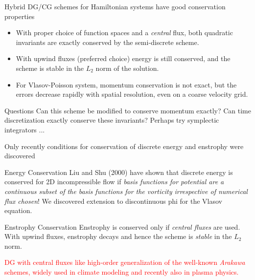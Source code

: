\documentclass[pdf]{beamer}
\newcommand{\mypause}{}
\theoremstyle{definition}
\begin{document}
\begin{frame}{Hybrid DG/CG schemes for Hamiltonian systems have good
    conservation properties}

  \begin{itemize}
  \item With proper choice of function spaces and a \emph{central}
    flux, both quadratic invariants are exactly conserved by the
    semi-discrete scheme.
  \item With upwind fluxes (preferred choice) energy is still
    conserved, and the scheme is stable in the $L_2$ norm of the
    solution.
  \item For Vlasov-Poisson system, momentum conservation is not exact,
    but the errors decrease rapidly with spatial resolution, even on a
    coarse velocity grid.
  \end{itemize}
  \mypause
  \begin{block}{Questions}
    Can this scheme be modified to conserve momentum exactly? Can time
    discretization exactly conserve these invariants?  Perhaps try
    symplectic integrators ...
  \end{block}

\end{frame}

\begin{frame}{Only recently conditions for conservation of discrete
    energy and enstrophy were discovered}%
  \small
  \begin{block}{Energy Conservation}
    Liu and Shu (2000) have shown that discrete energy is conserved
    for 2D incompressible flow if \emph{basis functions for potential
      are a continuous subset of the basis functions for the vorticity
      irrespective of numerical flux chosen}! We discovered extension
    to discontinuous phi for the Vlasov equation.
  \end{block}

  \begin{block}{Enstrophy Conservation}
    Enstrophy is conserved only if \emph{central fluxes} are
    used. With upwind fluxes, enstrophy decays and hence the scheme is
    \emph{stable} in the $L_2$ norm.
  \end{block}

  \mypause \textcolor{red}{DG with central fluxes like high-order
    generalization of the well-known \emph{Arakawa} schemes, widely
    used in climate modeling and recently also in plasma physics.}

\end{frame}
\end{document}
